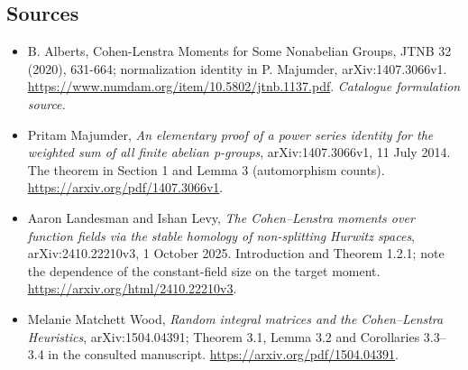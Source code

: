 \documentclass[11pt,a4paper]{article}
\numberwithin{equation}{section}
\begin{document}
\subsection{Sources}
\begin{itemize}\raggedright
\item[\textnormal{[S1]}]\hypertarget{source:116:1}{} B. Alberts, Cohen-Lenstra Moments for Some Nonabelian Groups, JTNB 32 (2020), 631-664; normalization identity in P. Majumder, arXiv:1407.3066v1.
\url{https://www.numdam.org/item/10.5802/jtnb.1137.pdf}.
{\small\textit{Catalogue formulation source.}}
\item[\textnormal{[E1]}]\hypertarget{extra:116:1}{} Pritam Majumder,
\emph{An elementary proof of a power series identity for the weighted sum
of all finite abelian p-groups}, arXiv:1407.3066v1, 11 July 2014.
The theorem in Section 1 and Lemma 3 (automorphism counts).
\url{https://arxiv.org/pdf/1407.3066v1}.
\item[\textnormal{[E2]}]\hypertarget{extra:116:2}{} Aaron Landesman and Ishan Levy,
\emph{The Cohen--Lenstra moments over function fields via the stable
homology of non-splitting Hurwitz spaces}, arXiv:2410.22210v3,
1 October 2025. Introduction and Theorem 1.2.1; note the dependence of
the constant-field size on the target moment.
\url{https://arxiv.org/html/2410.22210v3}.
\item[\textnormal{[E3]}]\hypertarget{extra:116:3}{} Melanie Matchett Wood,
\emph{Random integral matrices and the Cohen--Lenstra Heuristics},
arXiv:1504.04391; Theorem 3.1, Lemma 3.2 and Corollaries 3.3--3.4
in the consulted manuscript.
\url{https://arxiv.org/pdf/1504.04391}.
\end{itemize}
\end{document}
